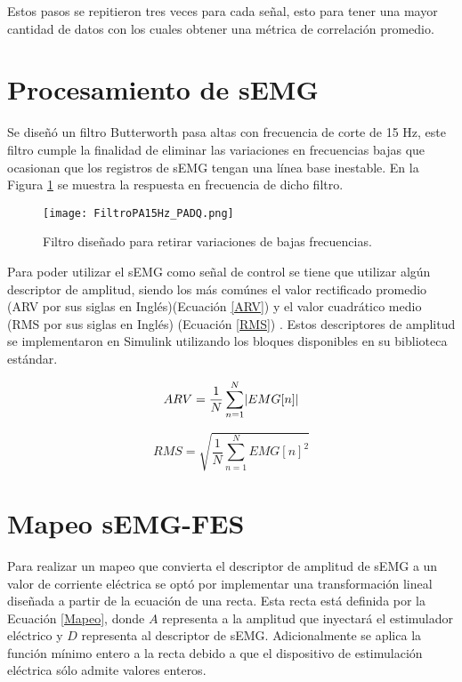 Estos pasos se repitieron tres veces para cada señal, esto para tener una mayor cantidad de datos con los cuales obtener una métrica de correlación promedio.

\section{Procesamiento de sEMG}

Se diseñó un filtro Butterworth pasa altas con frecuencia de corte de 15 Hz, este filtro cumple la finalidad de eliminar las variaciones en frecuencias bajas que ocasionan que los registros de sEMG tengan una línea base inestable. En la Figura \ref{Figura: FiltroPA} se muestra la respuesta en frecuencia de dicho filtro.

\begin{figure}[h]
	\centering
	\texttt{[image: FiltroPA15Hz\_PADQ.png]}
	\caption{Filtro diseñado para retirar variaciones de bajas frecuencias.}
	\label{Figura: FiltroPA}
\end{figure}

Para poder utilizar el sEMG como señal de control se tiene que utilizar algún descriptor de amplitud, siendo los más comúnes el valor rectificado promedio (ARV por sus siglas en Inglés)(Ecuación \ref{ARV}) y el valor cuadrático medio (RMS por sus siglas en Inglés) (Ecuación \ref{RMS}) \cite{Cavalcanti-Garcia2009}. Estos descriptores de amplitud se implementaron en Simulink utilizando los bloques disponibles en su biblioteca estándar.

\begin{equation}
	ARV = \frac{1}{N} \sum_{n=1}^{N} \lvert EMG[n]\rvert
	\label{ARV}
\end{equation}

\begin{equation}
	RMS = \sqrt{\frac{1}{N} \sum_{n=1}^{N} EMG[n]^{2}}
	\label{RMS}
\end{equation}

\newpage
\section{Mapeo sEMG-FES}
Para realizar un mapeo que convierta el descriptor de amplitud de sEMG a un valor de corriente eléctrica se optó por implementar una transformación lineal diseñada a partir de la ecuación de una recta. Esta recta está definida por la Ecuación \ref{Mapeo}, donde $A$ representa a la amplitud que inyectará el estimulador eléctrico y $D$ representa al descriptor de sEMG. Adicionalmente se aplica la función mínimo entero a la recta debido a que el dispositivo de estimulación eléctrica sólo admite valores enteros.

